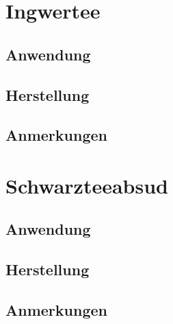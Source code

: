 \section{Ingwertee}

\subsection{Anwendung}

\subsection{Herstellung}

\subsection{Anmerkungen}




\section{Schwarzteeabsud}

\subsection{Anwendung}

\subsection{Herstellung}

\subsection{Anmerkungen}
